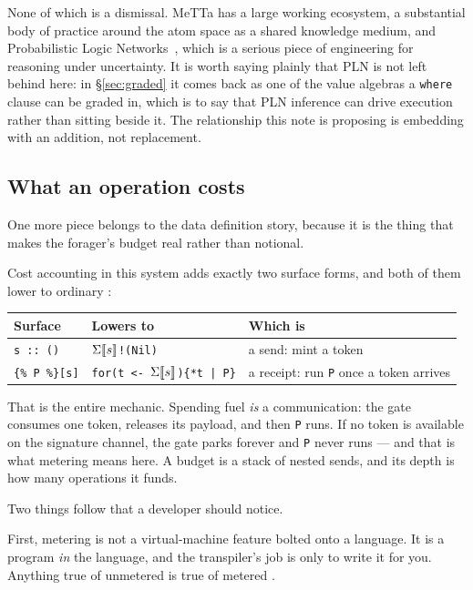 None of which is a dismissal. MeTTa has a large working ecosystem, a substantial
body of practice around the atom space as a shared knowledge medium, and
Probabilistic Logic Networks~\cite{PLN}, which is a serious piece of engineering for
reasoning under uncertainty. It is worth saying plainly that PLN is not left
behind here: in \S\ref{sec:graded} it comes back as one of the value algebras a
\texttt{where} clause can be graded in, which is to say that PLN inference can
drive execution rather than sitting beside it. The relationship this note is
proposing is embedding with an addition, not replacement.

\subsection{What an operation costs}
\label{sec:cost}

One more piece belongs to the data definition story, because it is the thing
that makes the forager's budget real rather than notional.

Cost accounting in this system adds exactly two surface forms, and both of them
lower to ordinary \flang{}:

\begin{center}
\small
\begin{tabular}{@{}lll@{}}
\toprule
\textbf{Surface} & \textbf{Lowers to} & \textbf{Which is} \\
\midrule
\texttt{s :: ()} & \texttt{$\Sigma\llbracket s \rrbracket$!(Nil)} & a send: mint a token \\
\texttt{\{\% P \%\}[s]} & \texttt{for(t <- $\Sigma\llbracket s \rrbracket$)\{*t | P\}} & a receipt: run \texttt{P} once a token arrives \\
\bottomrule
\end{tabular}
\end{center}

That is the entire mechanic. Spending fuel \emph{is} a communication: the gate
consumes one token, releases its payload, and then \texttt{P} runs. If no token
is available on the signature channel, the gate parks forever and \texttt{P}
never runs --- and that is what metering means here. A budget is a stack of
nested sends, and its depth is how many operations it funds.

Two things follow that a developer should notice.

First, metering is not a virtual-machine feature bolted onto a language. It is a
program \emph{in} the language, and the transpiler's job is only to write it for
you. Anything true of unmetered \flang{} is true of metered \flang{}.

